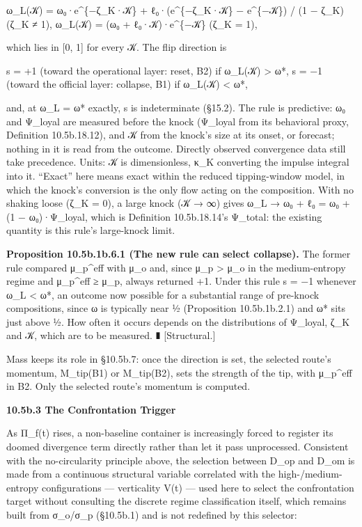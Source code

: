 \documentclass[
]{article}
\begin{document}
ω\_L(𝒦) = ω₀·e\^{}\{−ζ\_K·𝒦\} + ℓ₀·(e\^{}\{−ζ\_K·𝒦\} − e\^{}\{−𝒦\}) / (1
− ζ\_K) (ζ\_K ≠ 1), ω\_L(𝒦) = (ω₀ + ℓ₀·𝒦)·e\^{}\{−𝒦\} (ζ\_K = 1),

which lies in {[}0, 1{]} for every 𝒦. The flip direction is

s = +1 (toward the operational layer: reset, B2) if ω\_L(𝒦)
\textgreater{} ω*, s = −1 (toward the official layer: collapse, B1) if
ω\_L(𝒦) \textless{} ω*,

and, at ω\_L = ω* exactly, s is indeterminate (§15.2). The rule is
predictive: ω₀ and Ψ\_loyal are measured before the knock (Ψ\_loyal from
its behavioral proxy, Definition 10.5b.18.12), and 𝒦 from the knock's
size at its onset, or forecast; nothing in it is read from the outcome.
Directly observed convergence data still take precedence. Units: 𝒦 is
dimensionless, κ\_K converting the impulse integral into it. ``Exact''
here means exact within the reduced tipping-window model, in which the
knock's conversion is the only flow acting on the composition. With no
shaking loose (ζ\_K = 0), a large knock (𝒦 → ∞) gives ω\_L → ω₀ + ℓ₀ =
ω₀ + (1 − ω₀)·Ψ\_loyal, which is Definition 10.5b.18.14's Ψ\_total: the
existing quantity is this rule's large-knock limit.

\textbf{Proposition 10.5b.1b.6.1 (The new rule can select collapse).}
The former rule compared μ\_p\^{}eff with μ\_o and, since μ\_p
\textgreater{} μ\_o in the medium-entropy regime and μ\_p\^{}eff ≥ μ\_p,
always returned +1. Under this rule s = −1 whenever ω\_L \textless{} ω*,
an outcome now possible for a substantial range of pre-knock
compositions, since ω is typically near ½ (Proposition 10.5b.1b.2.1) and
ω* sits just above ½. How often it occurs depends on the distributions
of Ψ\_loyal, ζ\_K and 𝒦, which are to be measured. ∎ {[}Structural.{]}

Mass keeps its role in §10.5b.7: once the direction is set, the selected
route's momentum, M\_tip(B1) or M\_tip(B2), sets the strength of the
tip, with μ\_p\^{}eff in B2. Only the selected route's momentum is
computed.

\textbf{10.5b.3 The Confrontation Trigger}

As Π\_f(t) rises, a non-baseline container is increasingly forced to
register its doomed divergence term directly rather than let it pass
unprocessed. Consistent with the no-circularity principle above, the
selection between D\_op and D\_om is made from a continuous structural
variable correlated with the high-/medium-entropy configurations ---
verticality V(t) --- used here to select the confrontation target
without consulting the discrete regime classification itself, which
remains built from σ\_o/σ\_p (§10.5b.1) and is not redefined by this
selector:
\end{document}
